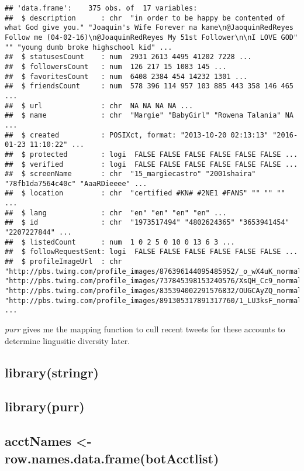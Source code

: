 \documentclass[]{article}
\begin{document}
\begin{verbatim}
## 'data.frame':    375 obs. of  17 variables:
##  $ description      : chr  "in order to be happy be contented of what God give you." "Joaquin's Wife Forever na kame\n@JaoquinRedReyes Follow me (04-02-16)\n@JoaquinRedReyes My 51st Follower\n\nI LOVE GOD" "" "young dumb broke highschool kid" ...
##  $ statusesCount    : num  2931 2613 4495 41202 7228 ...
##  $ followersCount   : num  126 217 15 1083 145 ...
##  $ favoritesCount   : num  6408 2384 454 14232 1301 ...
##  $ friendsCount     : num  578 396 114 957 103 885 443 358 146 465 ...
##  $ url              : chr  NA NA NA NA ...
##  $ name             : chr  "Margie" "BabyGirl" "Rowena Talania" NA ...
##  $ created          : POSIXct, format: "2013-10-20 02:13:13" "2016-01-23 11:10:22" ...
##  $ protected        : logi  FALSE FALSE FALSE FALSE FALSE FALSE ...
##  $ verified         : logi  FALSE FALSE FALSE FALSE FALSE FALSE ...
##  $ screenName       : chr  "15_margiecastro" "2001shaira" "78fb1da7564c40c" "AaaRDieeee" ...
##  $ location         : chr  "certified #KN# #2NE1 #FANS" "" "" "" ...
##  $ lang             : chr  "en" "en" "en" "en" ...
##  $ id               : chr  "1973517494" "4802624365" "3653941454" "2207227844" ...
##  $ listedCount      : num  1 0 2 5 0 10 0 13 6 3 ...
##  $ followRequestSent: logi  FALSE FALSE FALSE FALSE FALSE FALSE ...
##  $ profileImageUrl  : chr  "http://pbs.twimg.com/profile_images/876396144095485952/_o_wX4uK_normal.jpg" "http://pbs.twimg.com/profile_images/737845398153240576/XsQH_Cc9_normal.jpg" "http://pbs.twimg.com/profile_images/835394002291576832/OUGCAyZQ_normal.jpg" "http://pbs.twimg.com/profile_images/891305317891317760/1_LU3ksF_normal.jpg" ...
\end{verbatim}

\emph{purr} gives me the mapping function to cull recent tweets for
these accounts to determine lingusitic diversity later.

\hypertarget{librarystringr}{%
\subsection{library(stringr)}\label{librarystringr}}

\hypertarget{librarypurr}{%
\subsection{library(purr)}\label{librarypurr}}

\hypertarget{acctnames---row.names.data.framebotacctlist}{%
\subsection{acctNames \textless{}-
row.names.data.frame(botAcctlist)}\label{acctnames---row.names.data.framebotacctlist}}
\end{document}
